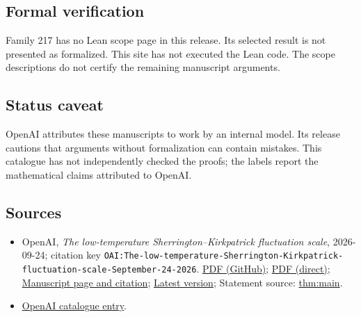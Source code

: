 \documentclass[11pt]{article}
\begin{document}
\subsection{Formal verification}
Family 217 has no Lean scope page in this release. Its selected result is not presented as formalized. This site has not executed the Lean code. The scope descriptions do not certify the remaining manuscript arguments.

\subsection{Status caveat}
OpenAI attributes these manuscripts to work by an internal model. Its release cautions that arguments without formalization can contain mistakes. This catalogue has not independently checked the proofs; the labels report the mathematical claims attributed to OpenAI.

\subsection{Sources}
\begin{itemize}
\item OpenAI, \emph{The low-temperature Sherrington–Kirkpatrick fluctuation scale}, 2026-09-24; citation key \texttt{OAI:The-low-temperature-Sherrington-Kirkpatrick-fluctuation-scale-September-24-2026}. \href{https://github.com/openai/math/blob/adc7f1241b42e322a6451854ab7e4b4c146bf78a/preprints/The-low-temperature-Sherrington-Kirkpatrick-fluctuation-scale-September-24-2026/The-low-temperature-Sherrington-Kirkpatrick-fluctuation-scale-September-24-2026.pdf}{PDF (GitHub)}; \href{https://github.com/openai/math/raw/adc7f1241b42e322a6451854ab7e4b4c146bf78a/preprints/The-low-temperature-Sherrington-Kirkpatrick-fluctuation-scale-September-24-2026/The-low-temperature-Sherrington-Kirkpatrick-fluctuation-scale-September-24-2026.pdf}{PDF (direct)}; \href{https://github.com/openai/math/blob/adc7f1241b42e322a6451854ab7e4b4c146bf78a/preprints/The-low-temperature-Sherrington-Kirkpatrick-fluctuation-scale-September-24-2026/README.md}{Manuscript page and citation}; \href{https://github.com/openai/math/blob/main/preprints/The-low-temperature-Sherrington-Kirkpatrick-fluctuation-scale-September-24-2026/The-low-temperature-Sherrington-Kirkpatrick-fluctuation-scale-September-24-2026.pdf}{Latest version}; Statement source: \href{https://github.com/openai/math/blob/adc7f1241b42e322a6451854ab7e4b4c146bf78a/preprints/The-low-temperature-Sherrington-Kirkpatrick-fluctuation-scale-September-24-2026/build/sections/introduction.tex\#L10}{thm:main}.
\item \href{https://github.com/openai/math/blob/adc7f1241b42e322a6451854ab7e4b4c146bf78a/CONTENTS.md}{OpenAI catalogue entry}.
\end{itemize}
\end{document}

